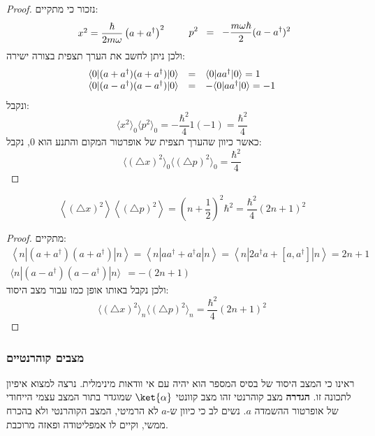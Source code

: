 \documentclass{tstextbook}
\begin{document}
\begin{proof}
נזכור כי מתקיים:
$$\begin{array}{c c l}{{x^{2}}}={{\displaystyle\frac{\hbar}{2m\omega}\left( a+a^{\dagger} \right)^{2}}}\end{array}\qquad p^{2}\;\;=\;\;-\frac{m\omega\hbar}2(a-a^{\dagger})^{2}$$
ולכן ניתן לחשב את הערך תצפית בצורה ישירה:
$$\begin{array}{l c l}{{\langle0|(a+a^{\dagger})(a+a^{\dagger})|0\rangle}}&{{=}}&{{\langle0|a a^{\dagger}|0\rangle=1}}\\ {{\langle0|(a-a^{\dagger})(a-a^{\dagger})|0\rangle}}&{{=}}&{{-\langle0|a a^{\dagger}|0\rangle=-1}}\end{array}$$
ונקבל:
$$\langle x^{2}\rangle_{0}\langle p^{2}\rangle_{0}=-\frac{\hbar^{2}}{4}1(-1)=\frac{\hbar^{2}}{4}$$
כאשר כיוון שהערך תצפית של אופרטור המקום והתנע הוא 0, נקבל:
$$\langle(\triangle x)^{2}\rangle_{0}\langle(\triangle p)^{2}\rangle_{0}=\frac{\hbar^{2}}{4}$$

\end{proof}
\begin{proposition}
$$\left\langle \left( \triangle x \right)^{2} \right\rangle\left\langle \left( \triangle p \right)^{2} \right\rangle=\left(n+\frac{1}{2}\right)^{2}\hbar^{2}=\frac{\hbar^{2}}{4}(2n+1)^{2}$$

\end{proposition}
\begin{proof}
מתקיים:
$$\begin{gather}\left\langle  n|\left( a+a^{\dagger} \right)\left( a+a^{\dagger} \right)|n \right\rangle=\left\langle  n|a a^{\dagger}+a^{\dagger}a|n \right\rangle=\left\langle  n|2a^{\dagger}a+\left[ a,a^{\dagger} \right]|n \right\rangle=2n+1  \\\langle n|(a-a^{\dagger})(a-a^{\dagger})|n\rangle\ \ =-(2n+1)
\end{gather}$$
ולכן נקבל באותו אופן כמו עבור מצב היסוד:
$$\langle(\triangle x)^{2}\rangle_{n}\langle(\triangle p)^{2}\rangle_{n}=\frac{\hbar^{2}}{4}(2n+1)^{2}$$

\end{proof}
\subsubsection{מצבים קוהרנטיים}

ראינו כי המצב היסוד של בסיס המספר הוא יהיה עם אי וודאות מינימלית. נרצה למצוא איפיון לתכונה זו.
\textbf{הגדרה} מצב קוהרנטי
זהו מצב קוונטי \(\ket{\alpha}\) שמוגדר בתור המצב עצמי הייחודי של אופרטור ההשמדה \(a\). נשים לב כי כיוון ש-\(a\) לא הרמיטי, המצב הקוהרנטי ולא בהכרח ממשי, וקיים לו אמפליטודה ופאזה מרוכבת.
\end{document}

